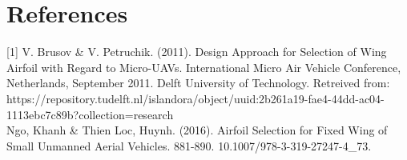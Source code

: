 \documentclass{article}
\begin{document}
\section*{References}

[1] V. Brusov \& V. Petruchik. (2011). Design Approach for Selection of Wing Airfoil with Regard to Micro-UAVs. International Micro Air Vehicle Conference, Netherlands, September 2011. Delft University of Technology. Retreived from: https://repository.tudelft.nl/islandora/object/uuid:2b261a19-fae4-44dd-ac04-1113ebc7c89b?collection=research \\

\noindent [2] Ngo, Khanh \& Thien Loc, Huynh. (2016). Airfoil Selection for Fixed Wing of Small Unmanned Aerial Vehicles. 881-890. 10.1007/978-3-319-27247-4\_73.
\end{document}
